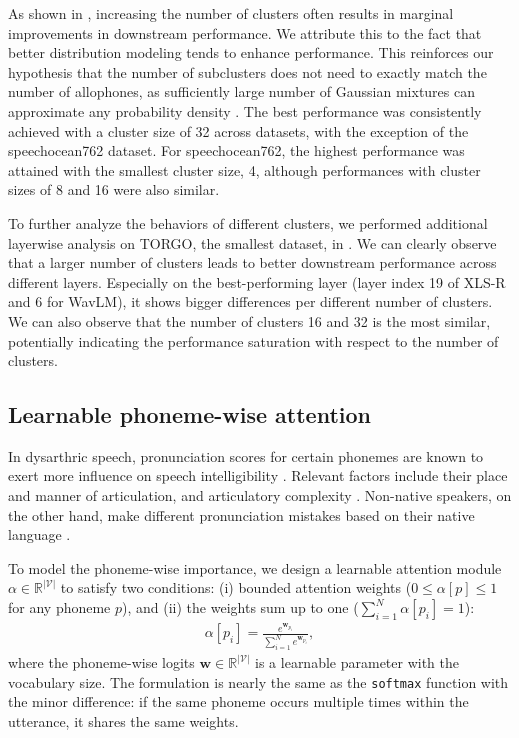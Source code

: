 As shown in , increasing the number of clusters often results in marginal improvements in downstream performance. 
We attribute this to the fact that better distribution modeling tends to enhance performance.
This reinforces our hypothesis that the number of subclusters does not need to exactly match the number of allophones, as sufficiently large number of Gaussian mixtures can approximate any probability density \citep{nguyen2020approx}.
The best performance was consistently achieved with a cluster size of 32 across datasets, with the exception of the speechocean762 dataset. 
For speechocean762, the highest performance was attained with the smallest cluster size, 4, although performances with cluster sizes of 8 and 16 were also similar.




To further analyze the behaviors of different clusters, we performed additional layerwise analysis on TORGO, the smallest dataset, in .
We can clearly observe that a larger number of clusters leads to better downstream performance across different layers.
Especially on the best-performing layer (layer index 19 of XLS-R and 6 for WavLM), it shows bigger differences per different number of clusters.
We can also observe that the number of clusters 16 and 32 is the most similar, potentially indicating the performance saturation with respect to the number of clusters.




\subsection{Learnable phoneme-wise attention}\label{subsec:attn}
In dysarthric speech, pronunciation scores for certain phonemes are known to exert more influence on speech intelligibility \citep{yeo23_interspeech}. 
Relevant factors include their place and manner of articulation, and articulatory complexity \citep{kim2010frequency}.
Non-native speakers, on the other hand, make different pronunciation mistakes based on their native language \citep{ng2023l1,yeo2023comparison}.


To model the phoneme-wise importance, we design a learnable attention module $\alpha \in \mathbb{R}^{|\mathcal{V}|}$ to satisfy two conditions: (i) bounded attention weights ($0 \leq \alpha[p] \leq 1$ for any phoneme $p$), and (ii) the weights sum up to one ($\sum_{i=1}^{N} \alpha[p_i] = 1$):
\begin{align}
    \alpha[p_i] = \frac{e^{\mathbf{w}_{p_i}}}{\sum_{i=1}^N e^{\mathbf{w}_{p_i}}},\label{eq:attn}
\end{align}
where the phoneme-wise logits $\mathbf{w} \in \mathbb{R}^{|\mathcal{V}|}$ is a learnable parameter with the vocabulary size.
The formulation is nearly the same as the \texttt{softmax} function with the minor difference: if the same phoneme occurs multiple times within the utterance, it shares the same weights.


